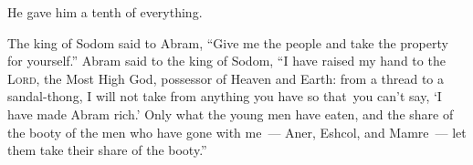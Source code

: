 \begin{inparaenum}
    
    
    {\noindent He gave him a tenth of everything.}
    
     The king of Sodom said to Abram, ``Give me the people and take the property for yourself.''%
     Abram said to the king of Sodom, ``I have raised my hand to the \textsc{Lord}, the Most High God, possessor of Heaven and Earth:%
     from a thread to a sandal-thong, I will not take from anything you have so that\understood\ you can't say, `I have made Abram rich.'%
     Only what the young men have eaten, and the share of the booty of the men who have gone with me~--- Aner, Eshcol, and Mamre~--- let them take their share of the booty.''%
\end{inparaenum}
